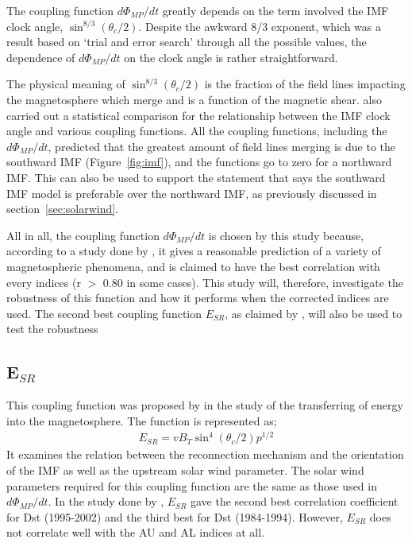\documentclass[12pt]{report} %
\begin{document}
The coupling function $d\Phi_{MP}/dt$ greatly depends on the term involved the IMF clock angle, $\sin^{8/3} (\theta_c/2)$. Despite the awkward 8/3 exponent, which was a result based on `trial and error search' through all the possible values, the dependence of $d\Phi_{MP}/dt$ on the clock angle is rather straightforward. 

The physical meaning of $\sin^{8/3} (\theta_c/2)$ is the fraction of the field lines impacting the magnetosphere which merge and is a function of the magnetic shear. \cite{newell07} also carried out a statistical comparison for the relationship between the IMF clock angle and various coupling functions. All the coupling functions, including the $d\Phi_{MP}/dt$, predicted that the greatest amount of field lines merging is due to the southward IMF (Figure~\ref{fig:imf}), and the functions go to zero for a northward IMF. This can also be used to support the statement that says the southward IMF model is preferable over the northward IMF, as previously discussed in section~\ref{sec:solarwind}.    

 All in all, the coupling function $d\Phi_{MP}/dt$ is chosen by this study because, according to a study done by \cite{newell07}, it gives a reasonable prediction of a variety of magnetospheric phenomena, and is claimed to have the best correlation with every indices (r $>$ 0.80 in some cases). This study will, therefore, investigate the robustness of this function and how it performs when the corrected indices are used. The second best coupling function $E_{SR}$, as claimed by \cite{newell07}, will also be used to test the robustness 


\vspace{-10pt}
\subsection{E$_{SR}$}
 \vspace{-5pt}
This coupling function was proposed by \cite{scurry91} in the study of the transferring of energy into the magnetosphere. The function is represented as;
\begin{align}
E_{SR} = v B_{T} \sin^{4} (\theta_c/2) p^{1/2} \label{eq:esr}
\end{align}
\noindent It examines the relation between the reconnection mechanism and the orientation of the IMF as well as the upstream solar wind parameter. The solar wind parameters required for this coupling function are the same as those used in  $d\Phi_{MP}/dt$. In the study done by \cite{newell07}, $E_{SR}$ gave the second best correlation coefficient for Dst (1995-2002) and the third best for Dst (1984-1994). However, $E_{SR}$ does not correlate well with the AU and AL indices at all. 
\end{document}
